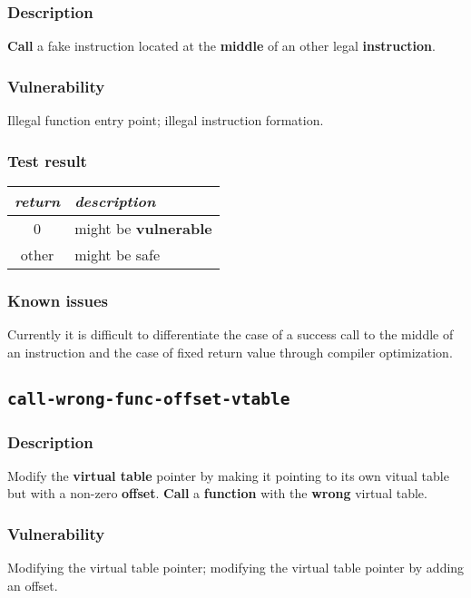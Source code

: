 \documentclass[a4paper]{book}
\begin{document}
\subsubsection{Description}
\textbf{Call} a fake instruction located at the \textbf{middle} of an other legal \textbf{instruction}.

\subsubsection{Vulnerability}
Illegal function entry point; illegal instruction formation.

\subsubsection{Test result}
\begin{tabular}{cl}
  \toprule
  \emph{return}  & \emph{description} \\
  \midrule
  0              & might be \textbf{vulnerable} \\
  other          & might be safe \\
  \bottomrule
\end{tabular}
  
\subsubsection{Known issues}

Currently it is difficult to differentiate the case of a success call to the middle of an instruction
and the case of fixed return value through compiler optimization.


\newpage
\subsection{\texttt{call-wrong-func-offset-vtable}}\label{test-call-wrong-func-offset-vtable}

\subsubsection{Description}
Modify the \textbf{virtual table} pointer by making it pointing to its own vitual table but with a non-zero \textbf{offset}.
\textbf{Call} a \textbf{function} with the \textbf{wrong} virtual table.

\subsubsection{Vulnerability}
Modifying the virtual table pointer; modifying the virtual table pointer by adding an offset.
\end{document}
